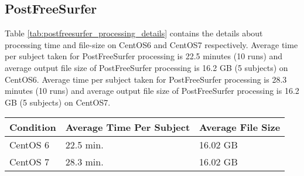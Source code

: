 

\subsection{PostFreeSurfer}
Table \ref{tab:postfreesurfer_processing_details} contains the details about processing time and file-size on CentOS6 and CentOS7 respectively.
Average time per subject taken for PostFreeSurfer processing is 22.5 minutes (10 runs) and average output file size of PostFreeSurfer processing is 16.2 GB (5 subjects) on CentOS6.
Average time per subject taken for PostFreeSurfer processing is 28.3 minutes (10 runs) and average output file size of PostFreeSurfer processing is 16.2 GB (5 subjects) on CentOS7.

\begin{center}
\begin{tabular}{ | l | l | l | }
  \hline
    \textbf{Condition} & \textbf{Average Time Per Subject} & \textbf{Average File Size} \\
  \hline
    CentOS 6 & 22.5 min. & 16.02 GB \\
  \hline
    CentOS 7 & 28.3 min. & 16.02 GB \\
  \hline
\end{tabular}
\label{tab:postfreesurfer_processing_details}
\end{center}


